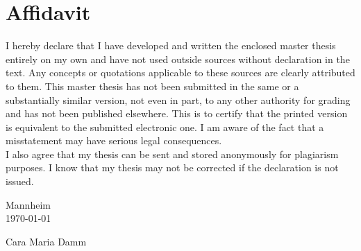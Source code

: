 \chapter*{\large Affidavit}
\pagestyle{empty}
I hereby declare that I have developed and written the enclosed master thesis entirely on my own and have not used outside sources without declaration in the text. Any concepts or quotations applicable to these sources are clearly attributed to them. This  master thesis has not been submitted in the same or a substantially similar version, not even in part, to any other authority for grading and has not been published elsewhere. This is to certify that the printed version is equivalent to the submitted electronic one. I am aware of the fact that a misstatement may have serious legal consequences.\\

I also agree that my thesis can be sent and stored anonymously for plagiarism purposes. I know that my thesis may not be corrected if the declaration is not issued.


\vspace{2.0cm}

Mannheim\\
\vspace{1cm}
\hspace{0.1cm} \today



\vspace{2cm}
Cara Maria Damm